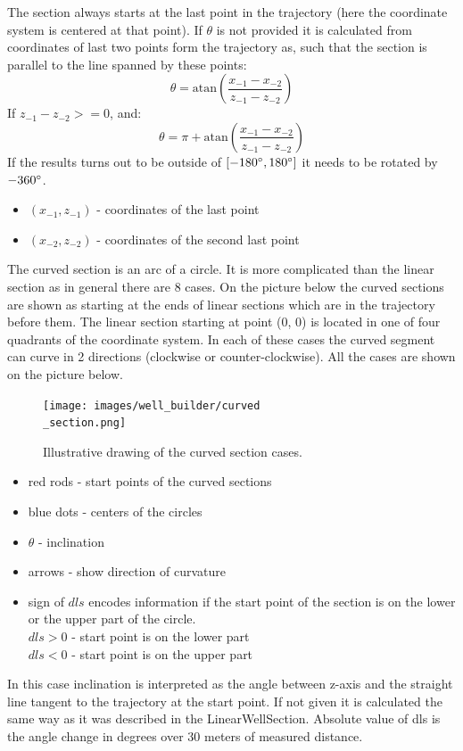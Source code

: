 	The section always starts at the last point in the trajectory (here the coordinate system is centered at that point). If $\theta$ is not provided it is calculated from coordinates of last two points form the trajectory as, such that the section is parallel to the line spanned by these points:
	\begin{equation}
		\theta = \mathrm{atan}\left(\frac{x_{-1} - x_{-2}}{z_{-1} - z_{-2}}\right)
	\end{equation}
	If $z_{-1} - z_{-2} >= 0$, and:
	\begin{equation}
		\theta = \pi + \mathrm{atan}\left(\frac{x_{-1} - x_{-2}}{z_{-1} - z_{-2}}\right)
	\end{equation}
	If the results turns out to be outside of $[-180\degree, 180\degree]$ it needs to be rotated by $-360\degree$.
	\begin{itemize}
		\item $(x_{-1}, z_{-1})$ - coordinates of the last point
		\item $(x_{-2}, z_{-2})$ - coordinates of the second last point
	\end{itemize}

	The curved section is an arc of a circle. It is more complicated than the linear section as in general there are 8 cases. On the picture below the curved sections are shown as starting at the ends of linear sections which are in the trajectory before them. The linear section starting at point (0, 0) is located in one of four quadrants of the coordinate system. In each of these cases the curved segment can curve in 2 directions (clockwise or counter-clockwise). All the cases are shown on the picture below.
	\begin{figure}[H]
		\centering
		\texttt{[image: images/well\_builder/curved\\\_section.png]}
		\caption{Illustrative drawing of the curved section cases.}
		\label{curved_section}
	\end{figure}
	\begin{itemize}
		\item red rods - start points of the curved sections
		\item blue dots - centers of the circles
		\item $\theta$ - inclination
		\item arrows - show direction of curvature
		\item sign of $dls$ encodes information if the start point of the section is on the lower or the upper part of the circle.\\
		$dls > 0$ - start point is on the lower part\\
		$dls < 0$ - start point is on the upper part\\
	\end{itemize}
	In this case inclination is interpreted as the angle between z-axis and the straight line tangent to the trajectory at the start point. If not given it is calculated the same way as it was described in the LinearWellSection. Absolute value of dls is the angle change in degrees over 30 meters of measured distance.\newline

